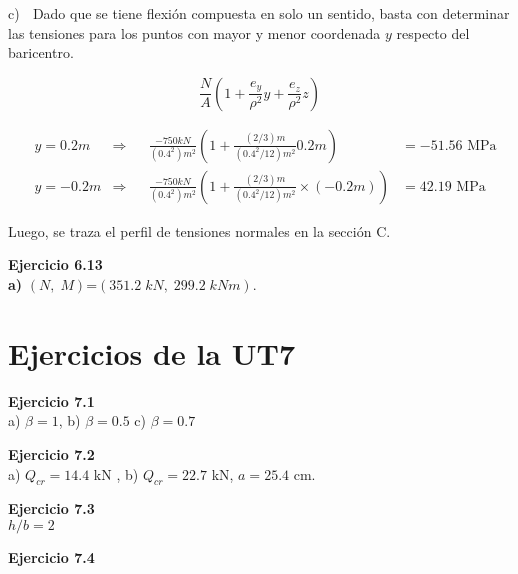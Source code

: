 c) $\;$ Dado que se tiene flexión compuesta en solo un sentido, basta con determinar las tensiones para los puntos con mayor y menor coordenada $y$ respecto del baricentro.

$$ \frac{N}{A} \left ( 1 +  \frac{e_y}{\rho^2} y + \frac{e_z}{\rho^2} z  \right )$$

\begin{align*}
&	y = 0.2m  &\Rightarrow && \frac{-750kN}{(0.4^2)m^2} \left ( 1 + \frac{(2/3)m}{(0.4^2/12)m^2} 0.2m \right )& = -51.56 \text{ MPa}\\
&	y =-0.2m  &\Rightarrow && \frac{-750kN}{(0.4^2)m^2} \left ( 1 + \frac{(2/3)m}{(0.4^2/12)m^2} \times (-0.2m) \right )&= 42.19 \text{ MPa}
\end{align*}

Luego, se traza el perfil de tensiones normales en la sección C.


\begin{center}
	\def\svgwidth{0.5\textwidth}
	
\end{center}

\textbf{Ejercicio 6.13}\\

\textbf{a)}  $(N,\;M)$=$(351.2\;kN,\;299.2\;kNm)$.


\section{Ejercicios de la UT7} 

\textbf{Ejercicio 7.1}\\

a) $\beta = 1$, b) $\beta = 0.5$ c) $\beta = 0.7$\newline

\textbf{Ejercicio 7.2}\\

a) $Q_{cr} = 14.4 $ kN ,  b) $Q_{cr} = 22.7 $ kN, $a=25.4$ cm.\newline



\textbf{Ejercicio 7.3}\\

\indent $h/b = 2$\newline

\textbf{Ejercicio 7.4}\\

